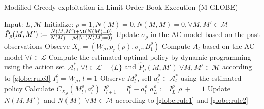             \begin{algorithm}
                \caption[Modified GLOBE Algorithm]{Modified Greedy exploitation in Limit Order Book Execution (M-GLOBE)}
                \begin{algorithmic}
                    \State Input: $L, \mathcal{M}$
                    \State Initialize: $\rho = 1, N(M)=0, N(M,M)=0, \forall M, M' \in \mathcal{M}$
                        \State $\hat P_\rho (M, M') := \frac{N(M, M') + \1(N(M) = 0)}{N(M) + |\mathcal M| \1 (N(M) = 0)}$
                        \State Update $\sigma_\rho$ in the AC model based on the past observations
                        \State Observe $X_\rho = (W_\rho, p_r(\rho), \sigma_\rho, B_1^\rho)$
                        \State Compute $A_l$ based on the AC model $\forall l \in \mathcal{L}$
                        \State Compute the estimated optimal policy by dynamic programming using the action set $\mathcal A_l^*$, $\forall l \in \mathcal{L} - \{L\}$ and $\hat P_\rho (M, M')\ \forall M, M' \in \mathcal M$ according to \eqref{globe:rule3}
                        \State $I_1^\rho = W_\rho$, $l=1$
                            \State Observe $M_l^\rho$, sell $a_l^\rho\in \mathcal{A}^*_l$ using the estimated policy
                            \State Calculate $C_{X_\rho}(M_l^\rho, a_l^\rho)$
                            \State $I_{l+1}^\rho = I_l^\rho - a_l^\rho$
                        \EndFor
                        \State $a_{L}^\rho := I_L^\rho$
                        \State $\rho\ +\!\!= 1$
                        \State Update $N(M, M')$ and $N(M)$ $\forall M \in \mathcal{M}$ according to \eqref{globe:rule1} and \eqref{globe:rule2}
                    \EndWhile
                \end{algorithmic}
                \label{algorithm:MGLOBE}
            \end{algorithm}

